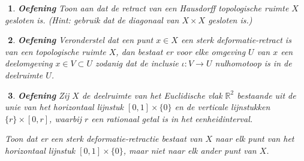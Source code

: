 \documentclass[12pt]{book}
\newtheorem{eoef}{$\!\!$}[chapter]
\newenvironment{oef}{\begin{eoef} {\bf Oefening}}{\end{eoef}}
\begin{document}
\begin{oef}
Toon aan dat de retract van een Hausdorff topologische ruimte $X$ gesloten is. (Hint: gebruik dat de diagonaal van $X \times X$ gesloten is.)
\end{oef}

\begin{oef}
Veronderstel dat een punt $x\in X$ een sterk deformatie-retract is van een topologische ruimte $X$, dan bestaat er voor elke omgeving $U$ van $x$ een deelomgeving $x \in V\subset U$ zodanig dat de inclusie $\iota: V \to U$ nulhomotoop is in de deelruimte $U$.
\end{oef}

\begin{oef}
Zij $X$ de deelruimte van het Euclidische vlak $\mathbb{R}^2$ bestaande uit de unie van het horizontaal lijnstuk $[0,1] \times \{0\}$ en de verticale lijnstukken $\{ r\} \times [0,r]$, waarbij $r$ een rationaal getal is in het eenheidinterval.

\begin{center}
\end{center}

Toon dat er een sterk deformatie-retractie bestaat van $X$ naar elk punt van het horizontaal lijnstuk $[0,1] \times \{0\}$, maar niet naar elk ander punt van $X$. 

\end{oef}
%
\end{document}

